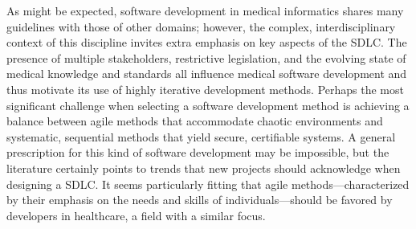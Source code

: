 \documentclass[12pt]{article} %
\begin{document}
As might be expected, software development in medical informatics shares many guidelines with those of other domains; however, the complex, interdisciplinary context of this discipline invites extra emphasis on key aspects of the SDLC. 
The presence of multiple stakeholders, restrictive legislation, and the evolving state of medical knowledge and standards all influence medical software development and thus motivate its use of highly iterative development methods. Perhaps the most significant challenge when selecting a software development method is achieving a balance between agile methods that accommodate chaotic environments and systematic, sequential methods that yield secure, certifiable systems. A general prescription for this kind of software development may be impossible, but the literature certainly points to trends that new projects should acknowledge when designing a SDLC. It seems particularly fitting that agile methods---characterized by their emphasis on the needs and skills of individuals---should be favored by developers in healthcare, a field with a similar focus.




\end{document}
